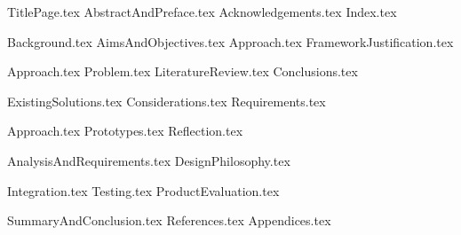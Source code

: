 \documentclass{COMPXXXX}
\begin{document}

{TitlePage.tex}
{AbstractAndPreface.tex}
{Acknowledgements.tex}
{Index.tex}

\newpage
{Background.tex}
{AimsAndObjectives.tex}
{Approach.tex}
{FrameworkJustification.tex}

\newpage
{Approach.tex}
{Problem.tex}
{LiteratureReview.tex}
{Conclusions.tex}

\newpage
{ExistingSolutions.tex}
{Considerations.tex}
{Requirements.tex}

\newpage
{Approach.tex}
{Prototypes.tex}
{Reflection.tex}

\newpage
{AnalysisAndRequirements.tex}
{DesignPhilosophy.tex}

\newpage
{Integration.tex}
{Testing.tex}
{ProductEvaluation.tex}

\newpage
{SummaryAndConclusion.tex}
{References.tex}
{Appendices.tex}
\end{document}
